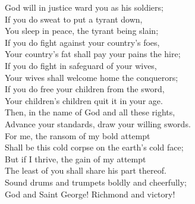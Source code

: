 \documentclass{article}
\begin{document}
\begin{description}
\hspace{1pt}God will in justice ward you as his soldiers;\\
\hspace{1pt}If you do sweat to put a tyrant down,\\
\hspace{1pt}You sleep in peace, the tyrant being slain;\\
\hspace{1pt}If you do fight against your country's foes,\\
\hspace{1pt}Your country's fat shall pay your pains the hire;\\
\hspace{1pt}If you do fight in safeguard of your wives,\\
\hspace{1pt}Your wives shall welcome home the conquerors;\\
\hspace{1pt}If you do free your children from the sword,\\
\hspace{1pt}Your children's children quit it in your age.\\
\hspace{1pt}Then, in the name of God and all these rights,\\
\hspace{1pt}Advance your standards, draw your willing swords.\\
\hspace{1pt}For me, the ransom of my bold attempt\\
\hspace{1pt}Shall be this cold corpse on the earth's cold face;\\
\hspace{1pt}But if I thrive, the gain of my attempt\\
\hspace{1pt}The least of you shall share his part thereof.\\
\hspace{1pt}Sound drums and trumpets boldly and cheerfully;\\
\hspace{1pt}God and Saint George! Richmond and victory!\\
\end{description}
\centering{\it [Exeunt]}\\
\\
\end{document}
